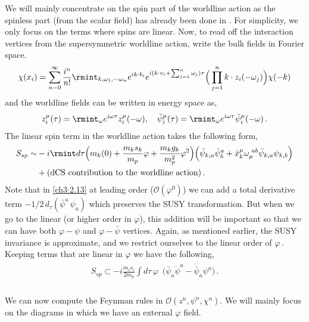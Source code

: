 We will mainly concentrate on the spin part of the worldline action as the spinless part (from the scalar field) has already been done in \cite{Bhattacharyya:2024aeq}. For simplicity, we only focus on the terms where spins are linear. Now, to read off the interaction vertices from the supersymmetric worldline action, write the bulk fields in Fourier space.
\begin{align}
    \begin{split}
        \chi(x_i)=\sum_{n-0}^{\infty}\frac{i^n}{n!}\rmint_{k,\omega_1,\cdots \omega_n}e^{ik\cdot b_i}e^{i(k\cdot v_i+\sum_{j=1}^{n}\omega_j)\tau}\Big(\prod_{j=1}^n k\cdot z_i(-\omega_j)\Big)\chi(-k)
    \end{split}
\end{align}
and the worldline fields can be written in energy space as,
\begin{align}
    \begin{split}
        z_{i}^{\mu}(\tau)=\rmint_{\omega} e^{i\omega \tau}z_i^\mu{(-\omega)},\,\,\,\,\,\,\breve{\psi}_i^\mu(\tau)=\rmint_{\omega}e^{i\omega \tau}\breve{\psi}_i^\mu(-\omega)\,.
    \end{split}
\end{align}
The linear spin term in the worldline action takes the following form,
\begin{align}
    \begin{split}
        S_{sp}\sim& -i\rmint d\tau \Big(m_k(0)+\frac{m_k s_k}{m_p} \varphi+\frac{m_k g_k }{m_p^2}\varphi^2\Big)\Big(\bar\psi_{k,a}\dot \psi_k^a+\dot x_k^\mu \omega_{\mu}^{\,\,ab}\bar \psi_{k,a} \psi_{k,b}\Big)\\ &+(\textrm{dCS contribution to the worldline action})\,.\label{ch3:2.13}
    \end{split}
\end{align}
Note that in \eqref{ch3:2.13} at leading order ($\mathcal{O}(\varphi^0)$) we can add a total derivative term $-1/2\, d_{\tau}(\bar\psi^a\,\psi_a)$ which preserves the SUSY transformation. But when we go to the linear (or higher order in $\varphi$), this addition will be important so that we can have both $\varphi-\psi$ and $\varphi-\bar\psi$ vertices. Again, as mentioned earlier, the SUSY invariance is approximate, and we restrict ourselves to the linear order of $\varphi\,.$ 
Keeping terms that are linear in $\varphi$ we have the following,
\begin{align}
    \begin{split}
        S_{sp}\subset -i\frac{m_i s_i}{2 m_p}\int d\tau\,\varphi\, \,\,\Big(\bar\psi _a \dot \psi^a-\dot{\bar\psi}_a \psi^a\Big)\,. \label{2.19}
    \end{split}
\end{align}
\\We can now compute the Feynman rules in $\mathcal{O}(z^n,{\psi}^n,\chi^n)$. We will mainly focus on the diagrams in which we have an external $\varphi$ field.

